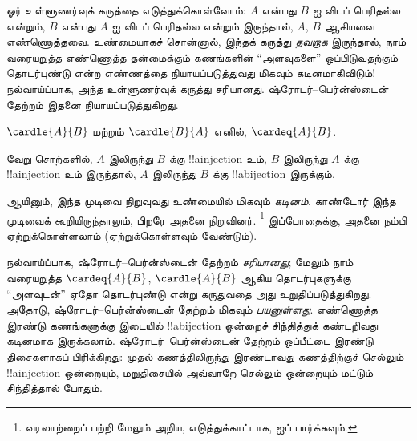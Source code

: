 \documentclass[../../../include/open-logic-section]{subfiles}
\begin{document}


\begin{explain}
ஓர் உள்ளுணர்வுக் கருத்தை எடுத்துக்கொள்வோம்:
$A$ என்பது $B$ ஐ விடப் பெரிதல்ல என்றும்,
$B$ என்பது $A$ ஐ விடப் பெரிதல்ல என்றும் இருந்தால்,
$A$, $B$ ஆகியவை எண்ணொத்தவை.
உண்மையாகச் சொன்னால், இந்தக் கருத்து \emph{தவறாக} இருந்தால்,
நாம் வரையறுத்த எண்ணொத்த தன்மைக்கும் கணங்களின் ``அளவுகளை''
ஒப்பிடுவதற்கும் தொடர்புண்டு என்ற எண்ணத்தை நியாயப்படுத்துவது
மிகவும் கடினமாகிவிடும்!{}
நல்வாய்ப்பாக, அந்த உள்ளுணர்வுக் கருத்து சரியானது.
ஷ்ரோடர்--பெர்ன்ஸ்டைன் தேற்றம் இதனை நியாயப்படுத்துகிறது.
\end{explain}

\begin{thm}[ஷ்ரோடர்--பெர்ன்ஸ்டைன்]
	$\cardle{A}{B}$ மற்றும் $\cardle{B}{A}$ எனில்,
	$\cardeq{A}{B}$.
\end{thm}

\begin{explain}
வேறு சொற்களில், $A$ இலிருந்து $B$ க்கு !!a{injection} உம்,
$B$ இலிருந்து $A$ க்கு !!a{injection} உம் இருந்தால்,
$A$ இலிருந்து $B$ க்கு !!a{bijection} இருக்கும்.

ஆயினும், இந்த முடிவை நிறுவுவது உண்மையில் மிகவும் \emph{கடினம்}.
காண்டோர் இந்த முடிவைக் கூறியிருந்தாலும், பிறரே அதனை நிறுவினர்.
\footnote{வரலாற்றைப் பற்றி மேலும் அறிய, எடுத்துக்காட்டாக,
\citet[pp.~165--6]{Potter2004} ஐப் பார்க்கவும்.}
%
இப்போதைக்கு, அதனை நம்பி ஏற்றுக்கொள்ளலாம் (ஏற்றுக்கொள்ளவும் வேண்டும்).

நல்வாய்ப்பாக, ஷ்ரோடர்--பெர்ன்ஸ்டைன் தேற்றம் \emph{சரியானது};
மேலும் நாம் வரையறுத்த $\cardeq{A}{B}$, $\cardle{A}{B}$ ஆகிய
தொடர்புகளுக்கு ``அளவுடன்'' ஏதோ தொடர்புண்டு என்று கருதுவதை
அது உறுதிப்படுத்துகிறது.
அதோடு, ஷ்ரோடர்--பெர்ன்ஸ்டைன் தேற்றம் மிகவும் \emph{பயனுள்ளது}.
எண்ணொத்த இரண்டு கணங்களுக்கு இடையில் !!a{bijection} ஒன்றைச்
சிந்தித்துக் கண்டறிவது கடினமாக இருக்கலாம்.
ஷ்ரோடர்--பெர்ன்ஸ்டைன் தேற்றம் ஒப்பீட்டை இரண்டு திசைகளாகப் பிரிக்கிறது:
முதல் கணத்திலிருந்து இரண்டாவது கணத்திற்குச் செல்லும் !!a{injection}
ஒன்றையும், மறுதிசையில் அவ்வாறே செல்லும் ஒன்றையும் மட்டும் சிந்தித்தால் போதும்.
\end{explain}
\end{document}
